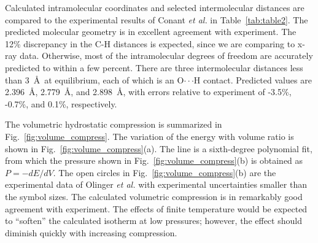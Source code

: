 \documentclass[prb,aps,nobibnotes,twocolumn,doublespace,twocolumngrid,superbib]{revtex4}
\begin{document}
Calculated intramolecular coordinates and selected intermolecular
distances are compared to the experimental results of 
Conant {\it et al.}\cite{Conant_1979} in Table~\ref{tab:table2}. 
The predicted molecular geometry is in excellent agreement
with experiment.  The 12\% discrepancy in the C-H distances is expected,
since we are comparing to x-ray data.  Otherwise, most of the intramolecular
degrees of freedom are accurately predicted to within a few percent.
There are three intermolecular distances less than 3~\AA\ at equilibrium,
each of which is an O$\cdot\cdot\cdot$H contact.  Predicted values are 2.396~\AA, 2.779~\AA,
and 2.898~\AA, with errors relative to experiment of -3.5\%, -0.7\%, and
0.1\%, respectively.

The volumetric hydrostatic compression is summarized in 
Fig.~\ref{fig:volume_compress}.  The 
variation of the energy with volume ratio is shown in 
Fig.~\ref{fig:volume_compress}(a).
The line is a sixth-degree polynomial fit, from which the pressure
shown in Fig.~\ref{fig:volume_compress}(b) is obtained as $P=-dE/dV$.  
The open circles in Fig.~\ref{fig:volume_compress}(b) 
are the experimental data of Olinger {\it et al.}\/ with
experimental uncertainties smaller than the symbol sizes.  
The calculated volumetric compression
is in remarkably good agreement with experiment.  The effects of finite 
temperature would be expected to ``soften'' the calculated 
isotherm at low pressures; however, the effect should
diminish quickly with increasing compression.
\end{document}
